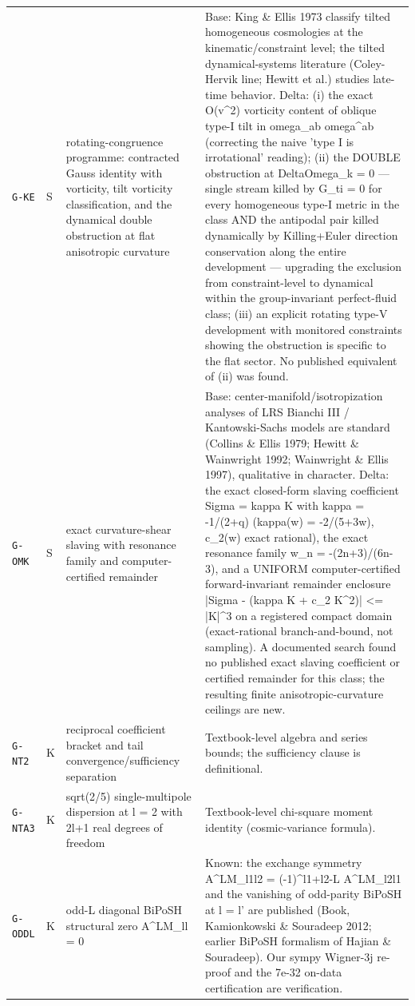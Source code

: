 \documentclass[10pt]{article}
\theoremstyle{definition}
\newcommand{\code}[1]{\texttt{\small #1}}
\begin{document}
\begin{center}
\begin{longtable}{p{2.0cm} p{0.7cm} p{5.4cm} p{6.5cm}}
\code{G-KE} & S & rotating-congruence programme: contracted Gauss identity with vorticity, tilt vorticity classification, and the dynamical double obstruction at flat anisotropic curvature & Base: King \& Ellis 1973 classify tilted homogeneous cosmologies at the kinematic/constraint level; the tilted dynamical-systems literature (Coley-Hervik line; Hewitt et al.) studies late-time behavior. Delta: (i) the exact O(v\^{}2) vorticity content of oblique type-I tilt in omega\_ab omega\^{}ab (correcting the naive 'type I is irrotational' reading); (ii) the DOUBLE obstruction at DeltaOmega\_k = 0 — single stream killed by G\_ti = 0 for every homogeneous type-I metric in the class AND the antipodal pair killed dynamically by Killing+Euler direction conservation along the entire development — upgrading the exclusion from constraint-level to dynamical within the group-invariant perfect-fluid class; (iii) an explicit rotating type-V development with monitored constraints showing the obstruction is specific to the flat sector. No published equivalent of (ii) was found. \\[2pt]
\code{G-OMK} & S & exact curvature-shear slaving with resonance family and computer-certified remainder & Base: center-manifold/isotropization analyses of LRS Bianchi III / Kantowski-Sachs models are standard (Collins \& Ellis 1979; Hewitt \& Wainwright 1992; Wainwright \& Ellis 1997), qualitative in character. Delta: the exact closed-form slaving coefficient Sigma = kappa K with kappa = -1/(2+q) (kappa(w) = -2/(5+3w), c\_2(w) exact rational), the exact resonance family w\_n = -(2n+3)/(6n-3), and a UNIFORM computer-certified forward-invariant remainder enclosure |Sigma - (kappa K + c\_2 K\^{}2)| <= |K|\^{}3 on a registered compact domain (exact-rational branch-and-bound, not sampling). A documented search found no published exact slaving coefficient or certified remainder for this class; the resulting finite anisotropic-curvature ceilings are new. \\[2pt]
\code{G-NT2} & K & reciprocal coefficient bracket and tail convergence/sufficiency separation & Textbook-level algebra and series bounds; the sufficiency clause is definitional. \\[2pt]
\code{G-NTA3} & K & sqrt(2/5) single-multipole dispersion at l = 2 with 2l+1 real degrees of freedom & Textbook-level chi-square moment identity (cosmic-variance formula). \\[2pt]
\code{G-ODDL} & K & odd-L diagonal BiPoSH structural zero A\^{}{LM}\_{ll} = 0 & Known: the exchange symmetry A\^{}{LM}\_{l1l2} = (-1)\^{}{l1+l2-L} A\^{}{LM}\_{l2l1} and the vanishing of odd-parity BiPoSH at l = l' are published (Book, Kamionkowski \& Souradeep 2012; earlier BiPoSH formalism of Hajian \& Souradeep). Our sympy Wigner-3j re-proof and the 7e-32 on-data certification are verification. \\[2pt]

\end{longtable}
\end{center}
\end{document}
